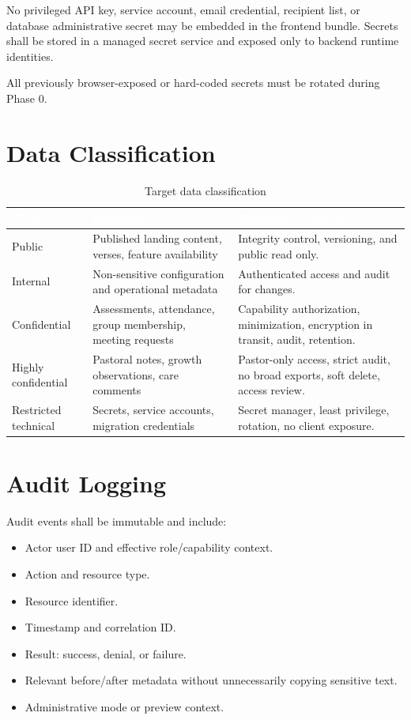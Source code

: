 \documentclass[11pt,a4paper,oneside]{report}
\begin{document}
No privileged API key, service account, email credential, recipient list, or database administrative secret may be embedded in the frontend bundle. Secrets shall be stored in a managed secret service and exposed only to backend runtime identities.

All previously browser-exposed or hard-coded secrets must be rotated during Phase 0.

\section{Data Classification}

\begin{table}[H]
\centering
{}
\begin{tabularx}{\linewidth}{@{}l X X@{}}
\toprule
\rowcolor{primary}
\textcolor{white}{\textbf{Class}} & \textcolor{white}{\textbf{Examples}} & \textcolor{white}{\textbf{Minimum Controls}} \\
\midrule
Public & Published landing content, verses, feature availability & Integrity control, versioning, and public read only. \\
Internal & Non-sensitive configuration and operational metadata & Authenticated access and audit for changes. \\
Confidential & Assessments, attendance, group membership, meeting requests & Capability authorization, minimization, encryption in transit, audit, retention. \\
Highly confidential & Pastoral notes, growth observations, care comments & Pastor-only access, strict audit, no broad exports, soft delete, access review. \\
Restricted technical & Secrets, service accounts, migration credentials & Secret manager, least privilege, rotation, no client exposure. \\
\bottomrule
\end{tabularx}
\caption{Target data classification}
\end{table}

\section{Audit Logging}

Audit events shall be immutable and include:

\begin{itemize}
  \item Actor user ID and effective role/capability context.
  \item Action and resource type.
  \item Resource identifier.
  \item Timestamp and correlation ID.
  \item Result: success, denial, or failure.
  \item Relevant before/after metadata without unnecessarily copying sensitive text.
  \item Administrative mode or preview context.
\end{itemize}
\end{document}
